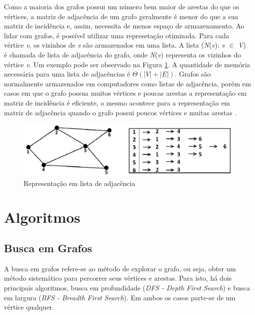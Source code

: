 Como a maioria dos grafos possui um número bem maior de arestas do que os vértices, a matriz de adjacência de um grafo geralmente é menor do que a sua matriz de incidência e, assim, necessita de menos espaço de armazenamento. Ao lidar com grafos, é possível utilizar uma represetação otimizada. Para cada vértice \textit{v}, os vizinhos de \textit{v} são armazenados em uma lista. A lista (\textit{N}(\textit{v}): \textit{v $\in$ V}) é chamada de lista de adjacência do grafo, onde \textit{N}(\textit{v}) representa os vizinhos do vértice \textit{v}. Um exemplo pode ser observado na Figura \ref{lista_adjacencia}. A quantidade de memória necessária para uma lista de adjacências é $\Theta(|\textit{V}| + |\textit{E}|)$. Grafos são normalmente armazenados em computadores como listas de adjacência, porém em casos em que o grafo possua muitos vértices e poucas arestas a representação em matriz de incidência é eficiente, o mesmo acontece para a representação em matriz de adjacência quando o grafo possui poucos vértices e muitas arestas \cite{Costa:2011}.

\begin{figure}[!h]
	\centering
	\includegraphics[scale=0.3]{figuras/capitulo2/lista_adjacencia.eps}
	\caption[Representação em lista de adjacência]{Representação em lista de adjacência \cite{Costa:2011}}
	\label{lista_adjacencia}
\end{figure}

\section{Algoritmos}

\subsection{Busca em Grafos}

A busca em grafos refere-se ao método de explorar o grafo, ou seja, obter um método sistemático para percorrer seus vértices e arestas. Para isto, há dois principais algoritmos, busca em profundidade (\textit{DFS - Depth First Search}) e busca em largura (\textit{BFS - Breadth First Search}). Em ambos os casos parte-se de um vértice qualquer.

